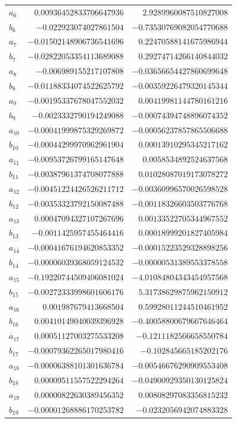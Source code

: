 \documentclass[11pt]{article}
\theoremstyle{definition}
\begin{document}
{\begin{longtable}{lrr}
$a_{6}$ & $0.00936452833706647936$ & $2.9289960087510827008$\\
$b_{6}$ & $-0.022923074027861504$ & $-0.73530769082054770688$\\
$a_{7}$ & $-0.01502148906736541696$ & $0.22470588141675986944$\\
$b_{7}$ & $-0.02822053354113689088$ & $0.29274714266140844032$\\
$a_{8}$ & $-0.006989155217107808$ & $-0.03656654427860699648$\\
$b_{8}$ & $-0.01188334074522625792$ & $-0.00359226479320145344$\\
$a_{9}$ & $-0.00195337678047552032$ & $0.00419981144780161216$\\
$b_{9}$ & $-0.0023332790194249088$ & $-0.00074394748896074352$\\
$a_{10}$ & $-0.00041999875329269872$ & $-0.00056237857865506688$\\
$b_{10}$ & $-0.00044299970962961904$ & $0.00013910295345217162$\\
$a_{11}$ & $-0.00953726799165147648$ & $0.0058534892524637568$\\
$b_{11}$ & $-0.00387961374708077888$ & $0.01028087019173078272$\\
$a_{12}$ & $-0.00451224426526211712$ & $-0.00360996570026598528$\\
$b_{12}$ & $-0.00353323792150087488$ & $-0.00118326603503776768$\\
$a_{13}$ & $0.00047094327107267696$ & $0.00133522705344967552$\\
$b_{13}$ & $-0.0011425957455464416$ & $0.00018999201827405984$\\
$a_{14}$ & $-0.00041676194620853352$ & $-0.00015223529328898256$\\
$b_{14}$ & $-0.00006039368059124532$ & $-0.00000531389553378558$\\
$a_{15}$ & $-0.19220744509406081024$ & $-4.01084804343454957568$\\
$b_{15}$ & $-0.00272333998601606176$ & $5.31738629875962150912$\\
$a_{16}$ & $0.001987679413668504$ & $0.59928011244510461952$\\
$b_{16}$ & $0.00410149040039396928$ & $-0.40058800679667646464$\\
$a_{17}$ & $0.00051127003275533208$ & $-0.1211182566658550784$\\
$b_{17}$ & $-0.00079362265017980416$ & $-0.102845665185202176$\\
$a_{18}$ & $-0.00006388101301636784$ & $-0.00546676290909553408$\\
$b_{18}$ & $0.00009511557522294264$ & $-0.04900929350130125824$\\
$a_{19}$ & $0.00000822630389456352$ & $0.00808297083356815232$\\
$b_{19}$ & $-0.00001268886170253782$ & $-0.0232056942074883328$\\
\bottomrule
\end{longtable}}
\end{document}
